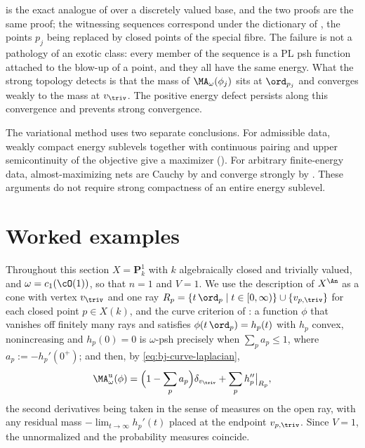 \begin{remark}
\label{rem:ch48-failure-shape}
 is the exact analogue of
 over a discretely valued base, and
the two proofs are the same proof; the witnessing sequences correspond
under the dictionary of , the points $p_j$ being
replaced by closed points of the special fibre.  The failure is not a
pathology of an exotic class: every member of the sequence is a PL psh
function attached to the blow-up of a point, and they all have the same
energy.  What the strong topology detects is that the mass of
$\MA_\omega(\phi_j)$ sits at $\ord_{p_j}$ and converges weakly to the mass at
$v_{\triv}$. The positive energy defect persists along this convergence
and prevents strong convergence.

The variational method uses two separate conclusions.
For admissible data, weakly compact energy sublevels together with
continuous pairing and upper semicontinuity of the objective give
a maximizer ().
For arbitrary finite-energy data, almost-maximizing nets are Cauchy
by  and converge strongly by
. These arguments do not require
strong compactness of an entire energy sublevel.
\end{remark}

\section{Worked examples}
\label{sec:ch48-examples}

Throughout this section $X=\mathbf P^1_k$ with $k$ algebraically closed
and trivially valued, and $\omega=c_1(\cO(1))$, so that $n=1$ and
$V=1$.  We use the description of $X^{\An}$ as a cone with vertex
$v_{\triv}$ and one ray
$R_p=\{t\,\ord_p\mid t\in[0,\infty)\}\cup\{v_{p,\triv}\}$ for each closed
point $p\in X(k)$, and the curve criterion of
: a function $\phi$ that vanishes off finitely
many rays and satisfies $\phi(t\,\ord_p)=h_p(t)$ with $h_p$ convex,
nonincreasing and $h_p(0)=0$ is $\omega$-psh precisely when
$\sum_p a_p\le1$, where $a_p:=-h_p'(0^+)$; and then, by
\eqref{eq:bj-curve-laplacian},
\[
 \MA^{\mathrm u}_\omega(\phi)
 =\Bigl(1-\sum_pa_p\Bigr)\delta_{v_{\triv}}
   +\sum_p h_p''\big|_{R_p},
\]
the second derivatives being taken in the sense of measures on the open
ray, with any residual mass $-\lim_{t\to\infty}h_p'(t)$ placed at the
endpoint $v_{p,\triv}$.  Since $V=1$, the unnormalized and the
probability measures coincide.

